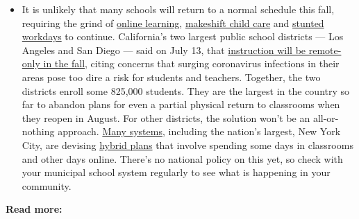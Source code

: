 \begin{itemize}
  \begin{itemize}
  \tightlist
  \item
    It is unlikely that many schools will return to a normal schedule
    this fall, requiring the grind of
    \href{https://www.nytimes3xbfgragh.onion/2020/06/05/us/coronavirus-education-lost-learning.html?action=click\&pgtype=Article\&state=default\&region=MAIN_CONTENT_3\&context=storylines_faq}{online
    learning},
    \href{https://www.nytimes3xbfgragh.onion/2020/05/29/us/coronavirus-child-care-centers.html?action=click\&pgtype=Article\&state=default\&region=MAIN_CONTENT_3\&context=storylines_faq}{makeshift
    child care} and
    \href{https://www.nytimes3xbfgragh.onion/2020/06/03/business/economy/coronavirus-working-women.html?action=click\&pgtype=Article\&state=default\&region=MAIN_CONTENT_3\&context=storylines_faq}{stunted
    workdays} to continue. California's two largest public school
    districts --- Los Angeles and San Diego --- said on July 13, that
    \href{https://www.nytimes3xbfgragh.onion/2020/07/13/us/lausd-san-diego-school-reopening.html?action=click\&pgtype=Article\&state=default\&region=MAIN_CONTENT_3\&context=storylines_faq}{instruction
    will be remote-only in the fall}, citing concerns that surging
    coronavirus infections in their areas pose too dire a risk for
    students and teachers. Together, the two districts enroll some
    825,000 students. They are the largest in the country so far to
    abandon plans for even a partial physical return to classrooms when
    they reopen in August. For other districts, the solution won't be an
    all-or-nothing approach.
    \href{https://bioethics.jhu.edu/research-and-outreach/projects/eschool-initiative/school-policy-tracker/}{Many
    systems}, including the nation's largest, New York City, are
    devising
    \href{https://www.nytimes3xbfgragh.onion/2020/06/26/us/coronavirus-schools-reopen-fall.html?action=click\&pgtype=Article\&state=default\&region=MAIN_CONTENT_3\&context=storylines_faq}{hybrid
    plans} that involve spending some days in classrooms and other days
    online. There's no national policy on this yet, so check with your
    municipal school system regularly to see what is happening in your
    community.
  \end{itemize}
\end{itemize}

\textbf{Read more:}

